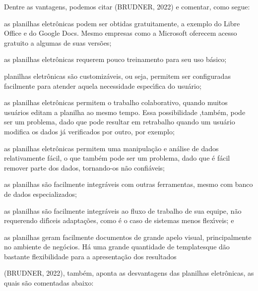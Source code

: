 \documentclass[
12pt,		%
openright,	%
twoside,  %
a4paper,			%
chapter=TITLE,		%
english,			%
french,				%
spanish,			%
brazil				%
]{USPSC-classe/USPSC}
\begin{document}
Dentre as vantagens, podemos citar (BRUDNER, 2022) e comentar, como segue:


















\begin{alineas}
\item as planilhas eletr\^onicas podem ser obtidas gratuitamente, a exemplo do Libre Office e do Google Docs. Mesmo empresas como a Microsoft oferecem acesso gratuito a algumas de suas vers\~oes;
\item as planilhas eletr\^onicas requerem pouco treinamento para seu uso b\'asico;
\item planilhas eletr\^onicas s\~ao \textquotedbl customiz\'aveis\textquotedbl , ou seja, permitem ser configuradas facilmente para atender aquela necessidade espec\'{\i}fica do usu\'ario;
\item as planilhas eletr\^onicas permitem o trabalho colaborativo, quando muitos usu\'arios editam a planilha ao mesmo tempo. Essa possibilidade ,tamb\'em, pode ser um problema, dado que pode resultar em retrabalho quando um usu\'ario modifica os dados j\'a verificados por outro, por exemplo;
\item as planilhas eletr\^onicas permitem uma manipula\c{c}\~ao e an\'alise de dados relativamente f\'acil, o que tamb\'em pode ser um problema, dado que \'e f\'acil remover parte dos dados, tornando-os n\~ao confi\'aveis;
\item as planilhas s\~ao facilmente integr\'aveis com outras ferramentas, mesmo com banco de dados especializados;
\item as planilhas s\~ao facilmente integr\'aveis ao fluxo de trabalho de sua equipe, n\~ao requerendo dif\'{\i}ceis adapta\c{c}\~oes, como \'e o caso de sistemas menos flex\'{\i}veis; e
\item as planilhas geram facilmente documentos de grande apelo visual, principalmente no ambiente de neg\'ocios. H\'a uma grande quantidade de \textquotedbl templates\textquotedbl  que d\~ao bastante flexibilidade para a apresenta\c{c}\~ao dos resultados
\end{alineas}

(BRUDNER, 2022), tamb\'em, aponta as desvantagens das planilhas eletr\^onicas, as quais s\~ao comentadas abaixo:
\end{document}
